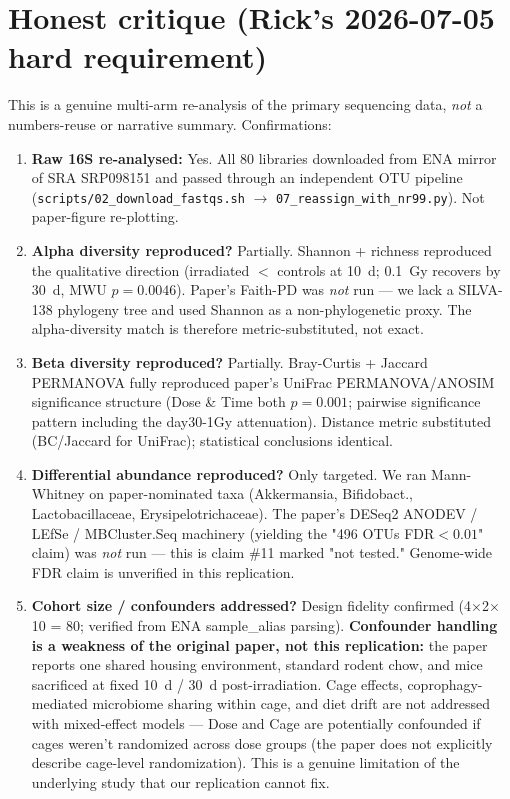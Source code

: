 \documentclass[11pt]{article}
\begin{document}
\section{Honest critique (Rick's 2026-07-05 hard requirement)}
This is a genuine multi-arm re-analysis of the primary sequencing data, \emph{not} a numbers-reuse or narrative summary. Confirmations:
\begin{enumerate}
  \item \textbf{Raw 16S re-analysed:} Yes. All 80 libraries downloaded from ENA mirror of SRA SRP098151 and passed through an independent OTU pipeline (\texttt{scripts/02\_download\_fastqs.sh} $\to$ \texttt{07\_reassign\_with\_nr99.py}). Not paper-figure re-plotting.
  \item \textbf{Alpha diversity reproduced?} Partially. Shannon + richness reproduced the qualitative direction (irradiated $<$ controls at 10~d; 0.1~Gy recovers by 30~d, MWU $p=0.0046$). Paper's Faith-PD was \emph{not} run --- we lack a SILVA-138 phylogeny tree and used Shannon as a non-phylogenetic proxy. The alpha-diversity match is therefore metric-substituted, not exact.
  \item \textbf{Beta diversity reproduced?} Partially. Bray-Curtis + Jaccard PERMANOVA fully reproduced paper's UniFrac PERMANOVA/ANOSIM significance structure (Dose \& Time both $p=0.001$; pairwise significance pattern including the day30-1Gy attenuation). Distance metric substituted (BC/Jaccard for UniFrac); statistical conclusions identical.
  \item \textbf{Differential abundance reproduced?} Only targeted. We ran Mann-Whitney on paper-nominated taxa (Akkermansia, Bifidobact., Lactobacillaceae, Erysipelotrichaceae). The paper's DESeq2 ANODEV / LEfSe / MBCluster.Seq machinery (yielding the "496 OTUs FDR$<0.01$" claim) was \emph{not} run --- this is claim \#11 marked "not tested." Genome-wide FDR claim is unverified in this replication.
  \item \textbf{Cohort size / confounders addressed?} Design fidelity confirmed (4$\times$2$\times$10 = 80; verified from ENA sample\_alias parsing). \textbf{Confounder handling is a weakness of the original paper, not this replication:} the paper reports one shared housing environment, standard rodent chow, and mice sacrificed at fixed 10~d / 30~d post-irradiation. Cage effects, coprophagy-mediated microbiome sharing within cage, and diet drift are not addressed with mixed-effect models --- Dose and Cage are potentially confounded if cages weren't randomized across dose groups (the paper does not explicitly describe cage-level randomization). This is a genuine limitation of the underlying study that our replication cannot fix.

\end{enumerate}
\end{document}

